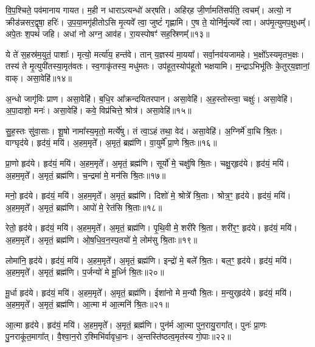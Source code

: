    वि॒प॒श्चिते॒ पव॑मानाय गायत।
   म॒ही न धाराऽत्यन्धो॑ अर्{‌}षति।
   अहि॑र्{‌}ह जी॒र्णामति॑सर्पति॒ त्वचम्᳚।
   अत्यो॒ न क्रीड॑न्नसर॒द्वृषा॒ हरिः॑।
   उ॒प॒या॒मगृ॑हीतोऽसि मृ॒त्यवे᳚ त्वा॒ जुष्टं॑ गृह्णामि।
   ए॒ष ते॒ योनि॑र्मृ॒त्यवे᳚ त्वा।
   अप॑मृ॒त्युमप॒क्षुधम्᳚।
   अपे॒तः श॒पथं॑ जहि।
   अधा॑ नो अग्न॒ आव॑ह।
   रा॒यस्पोषꣳ॑ सह॒स्रिणम्᳚॥१३॥

   ये ते॑ स॒हस्र॑म॒युतं॒ पाशाः᳚।
   मृत्यो॒ मर्त्या॑य॒ हन्त॑वे।
   तान् य॒ज्ञस्य॑ मा॒यया᳚।
   सर्वा॒नव॑यजामहे।
   भ॒क्षो᳚ऽस्यमृतभ॒क्षः।
   तस्य॑ ते मृ॒त्युपी॑तस्या॒मृत॑वतः।
   स्व॒गाकृ॑तस्य॒ मधु॑मतः।
   उप॑हूत॒स्योप॑हूतो भक्षयामि।
   म॒न्द्राऽभिभू॑तिः के॒तुर्{‌}य॒ज्ञानां॒ वाक्।
   असा॒वेहि॑॥१४॥

   अ॒न्धो जागृ॑विः प्राण।
   असा॒वेहि॑।
   ब॒धि॒र आ᳚क्रन्दयितरपान।
   असा॒वेहि॑।
   अ॒ह॒स्तोस्त्वा॒ चक्षुः॑।
   असा॒वेहि॑।
   अ॒पा॒दाशो॒ मनः॑।
   असा॒वेहि॑।
   कवे॒ विप्र॑चित्ते॒ श्रोत्र॑।
   असा॒वेहि॑॥१५॥

   सु॒ह॒स्तः सु॑वा॒साः।
   शू॒षो नामा᳚स्य॒मृतो॒ मर्त्ये॑षु।
   तं त्वा॒ऽहं तथा॒ वेद॑।
   असा॒वेहि॑।
   अ॒ग्निर्मे॑ वा॒चि श्रि॒तः।
   वाग्घृद॑ये।
   हृद॑यं॒ मयि॑।
   अ॒हम॒मृते᳚।
   अ॒मृतं॒ ब्रह्म॑णि।
   वा॒युर्मे᳚ प्रा॒णे श्रि॒तः॥१६॥

   प्रा॒णो हृद॑ये।
   हृद॑यं॒ मयि॑।
   अ॒हम॒मृते᳚।
   अ॒मृतं॒ ब्रह्म॑णि।
   सूर्यो॑ मे॒ चक्षु॑षि श्रि॒तः।
   चक्षु॒र्{‌}हृद॑ये।
   हृद॑यं॒ मयि॑।
   अ॒हम॒मृते᳚।
   अ॒मृतं॒ ब्रह्म॑णि।
   च॒न्द्रमा॑ मे॒ मन॑सि श्रि॒तः॥१७॥

   मनो॒ हृद॑ये।
   हृद॑यं॒ मयि॑।
   अ॒हम॒मृते᳚।
   अ॒मृतं॒ ब्रह्म॑णि।
   दिशो॑ मे॒ श्रोत्रे᳚ श्रि॒ताः।
   श्रोत्र॒ꣳ॒ हृद॑ये।
   हृद॑यं॒ मयि॑।
   अ॒हम॒मृते᳚।
   अ॒मृतं॒ ब्रह्म॑णि।
   आपो॑ मे॒ रेत॑सि श्रि॒ताः॥१८॥

   रेतो॒ हृद॑ये।
   हृद॑यं॒ मयि॑।
   अ॒हम॒मृते᳚।
   अ॒मृतं॒ ब्रह्म॑णि।
   पृ॒थि॒वी मे॒ शरी॑रे श्रि॒ता।
   शरी॑र॒ꣳ॒ हृद॑ये।
   हृद॑यं॒ मयि॑।
   अ॒हम॒मृते᳚।
   अ॒मृतं॒ ब्रह्म॑णि।
   ओ॒ष॒धि॒व॒न॒स्प॒तयो॑ मे॒ लोम॑सु श्रि॒ताः॥१९॥

   लोमा॑नि॒ हृद॑ये।
   हृद॑यं॒ मयि॑।
   अ॒हम॒मृते᳚।
   अ॒मृतं॒ ब्रह्म॑णि।
   इन्द्रो॑ मे॒ बले᳚ श्रि॒तः।
   बल॒ꣳ॒ हृद॑ये।
   हृद॑यं॒ मयि॑।
   अ॒हम॒मृते᳚।
   अ॒मृतं॒ ब्रह्म॑णि।
   प॒र्जन्यो॑ मे मू॒र्ध्नि श्रि॒तः॥२०॥

   मू॒र्धा हृद॑ये।
   हृद॑यं॒ मयि॑।
   अ॒हम॒मृते᳚।
   अ॒मृतं॒ ब्रह्म॑णि।
   ईशा॑नो मे म॒न्यौ श्रि॒तः।
   म॒न्युर्{‌}हृद॑ये।
   हृद॑यं॒ मयि॑।
   अ॒हम॒मृते᳚।
   अ॒मृतं॒ ब्रह्म॑णि।
   आ॒त्मा म॑ आ॒त्मनि॑ श्रि॒तः॥२१॥
   
   आ॒त्मा हृद॑ये।
   हृद॑यं॒ मयि॑।
   अ॒हम॒मृते᳚।
   अ॒मृतं॒ ब्रह्म॑णि।
   पुन॑र्म आ॒त्मा पुन॒रायु॒रागा᳚त्।
   पुनः॑ प्रा॒णः पु॒नराकू॑त॒मागा᳚त्।
   वै॒श्वा॒न॒रो र॒श्मिभि॑र्वावृधा॒नः।
   अ॒न्तस्ति॑ष्ठत्व॒मृत॑स्य गो॒पाः॥२२॥
\anuvakamend

